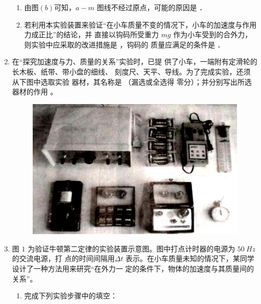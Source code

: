 \begin{enumerate}
\begin{enumerate}
\item 
由图$ (b) $可知，$ a-m $ 图线不经过原点，可能的原因是  ．




\item 
若利用本实验装置来验证“在小车质量不变的情况下，小车的加速度与作用力成正比”的结论，并
直接以钩码所受重力 $ mg $ 作为小车受到的合外力，则实验中应采取的改进措施是  ，钩码的
质量应满足的条件是  ．


\end{enumerate}






\item
{}
在“探究加速度与力、质量的关系”实验时，已提
供了小车，一端附有定滑轮的长木板、纸带、带小盘的细线、
刻度尺、天平、导线。为了完成实验，还须从下图中选取实验
器材，其名称是  
（漏选或全选得
零分）；并分别写出所选器材的作用 。
\begin{figure}[h!]
\centering
\includegraphics[width=0.4\linewidth]{picture/screenshot033}
\end{figure}




\newpage
\item
{}
图 $ 1 $ 为验证牛顿第二定律的实验装置示意图。图中打点计时器的电源为 $ 50 \ Hz $ 的交流电源，打
点的时间间隔用$ \Delta t $ 表示。在小车质量未知的情况下，某同学设计了一种方法用来研究“在外力一
定的条件下，物体的加速度与其质量间的关系”。
\begin{figure}[h!]
\centering

\end{figure}





\begin{enumerate}
\renewcommand{\labelenumi}{\arabic{enumi}.}
\item
完成下列实验步骤中的填空：




\end{enumerate}
\end{enumerate}
